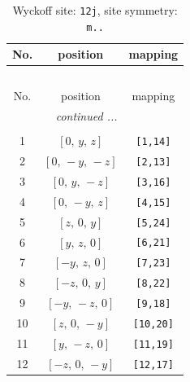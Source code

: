 \documentclass[fleqn,8pt]{jsarticle}
\begin{document}
\begin{longtable}{ccc}
\caption{Wyckoff site: {\tt 12j}, site symmetry: {\tt m..}}
 \\
 \hline \hline
No. & position & mapping \\ \hline \endfirsthead

\multicolumn{2}{l}{\tablename\ \thetable{}} \\
 \hline \hline
No. & position & mapping \\ \hline \endhead

 \hline \hline
\multicolumn{2}{r}{\footnotesize\it continued ...} \\ \endfoot

 \hline \hline
\multicolumn{2}{r}{} \\ \endlastfoot

1 & $\left[ 0,\, y,\, z \right]$ & {\tt [1,14]} \\ \hline
2 & $\left[ 0,\, - y,\, - z \right]$ & {\tt [2,13]} \\ \hline
3 & $\left[ 0,\, y,\, - z \right]$ & {\tt [3,16]} \\ \hline
4 & $\left[ 0,\, - y,\, z \right]$ & {\tt [4,15]} \\ \hline
5 & $\left[ z,\, 0,\, y \right]$ & {\tt [5,24]} \\ \hline
6 & $\left[ y,\, z,\, 0 \right]$ & {\tt [6,21]} \\ \hline
7 & $\left[ - y,\, z,\, 0 \right]$ & {\tt [7,23]} \\ \hline
8 & $\left[ - z,\, 0,\, y \right]$ & {\tt [8,22]} \\ \hline
9 & $\left[ - y,\, - z,\, 0 \right]$ & {\tt [9,18]} \\ \hline
10 & $\left[ z,\, 0,\, - y \right]$ & {\tt [10,20]} \\ \hline
11 & $\left[ y,\, - z,\, 0 \right]$ & {\tt [11,19]} \\ \hline
12 & $\left[ - z,\, 0,\, - y \right]$ & {\tt [12,17]} \\
\end{longtable}
\renewcommand{\arraystretch}{1.2}
\end{document}

